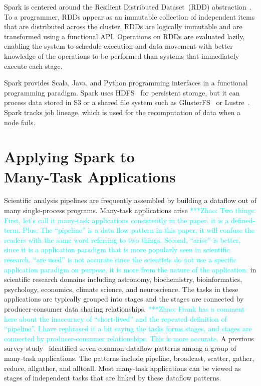 \documentclass[conference]{IEEEtran}
\newcommand{\zhaonote}[1]{{\textcolor{cyan}    { ***Zhao:      #1 }}}
\newcommand{\zhaonote}[1]{}
\begin{document}
Spark is centered around the Resilient Distributed Dataset~(RDD) abstraction~\cite{zaharia12}.
To a programmer, RDDs appear as an immutable collection of independent items that are 
distributed across the cluster. RDDs are logically immutable and are transformed using a
functional API. Operations on RDDs are evaluated lazily, enabling the system to schedule 
execution and data movement with better knowledge of the operations to be performed than 
systems that immediately execute each stage.

Spark provides Scala, Java, and Python programming interfaces in a functional
programming paradigm. Spark uses HDFS~\cite{shvachko10} for persistent storage, but
it can process data stored in S3 or a shared file system such as
GlusterFS~\cite{davies13} or Lustre~\cite{donovan03}. Spark tracks job lineage, which is used for the
recomputation of data when a node fails. 

\section{Applying Spark to \\ Many-Task Applications}
\label{sec:Capability}

Scientific analysis pipelines are frequently assembled by building a dataflow out of many
single-process programs. Many-task applications arise
\zhaonote{Two things. First, let's call it many-task applications consistently in the paper, it is a defined-term. Plus, 
The ``pipeline'' is a data flow pattern in this paper, it will confuse the readers with the same word referring to two things.
Second, ``arise'' is better, since it is a application paradigm that is more popularly seen in scientific research.
``are used'' is not accurate since the scientists do not use a specific application paradigm on purpose, it is more
from the nature of the application.}
 in scientific research
domains including astronomy, biochemistry, bioinformatics, psychology, economics, climate science,
and neuroscience. The tasks in these applications are typically grouped into stages and the stages are connected by
producer-consumer data sharing relationships. 
\zhaonote{Frank has a comment here about the inaccuracy of ``short-lived'' and the repeated definition of ``pipeline''. I have rephrased it a bit saying the tasks forms stages, and stages are connected
by producer-consumer relationships. This is more accurate.}
A previous survey study~\cite{katz11} identified
seven common dataflow patterns among a group of many-task applications. The patterns
include pipeline, broadcast, scatter, gather,
reduce, allgather, and alltoall. Most many-task applications
can be viewed as stages of independent tasks that are linked by these dataflow patterns.
\end{document}
